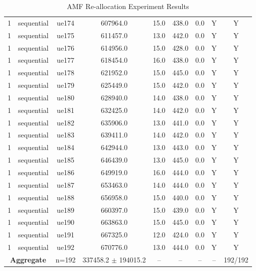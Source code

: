 \begin{table}[ht]
\begin{tabular}{|c|c|c|c|c|c|c|c|c|}
1 & sequential & ue174 & 607964.0 & 15.0 & 438.0 & 0.0 & Y & Y \\
1 & sequential & ue175 & 611457.0 & 13.0 & 442.0 & 0.0 & Y & Y \\
1 & sequential & ue176 & 614956.0 & 15.0 & 428.0 & 0.0 & Y & Y \\
1 & sequential & ue177 & 618454.0 & 16.0 & 438.0 & 0.0 & Y & Y \\
1 & sequential & ue178 & 621952.0 & 15.0 & 445.0 & 0.0 & Y & Y \\
1 & sequential & ue179 & 625449.0 & 15.0 & 442.0 & 0.0 & Y & Y \\
1 & sequential & ue180 & 628940.0 & 14.0 & 438.0 & 0.0 & Y & Y \\
1 & sequential & ue181 & 632425.0 & 14.0 & 442.0 & 0.0 & Y & Y \\
1 & sequential & ue182 & 635906.0 & 13.0 & 441.0 & 0.0 & Y & Y \\
1 & sequential & ue183 & 639411.0 & 14.0 & 442.0 & 0.0 & Y & Y \\
1 & sequential & ue184 & 642944.0 & 13.0 & 443.0 & 0.0 & Y & Y \\
1 & sequential & ue185 & 646439.0 & 13.0 & 445.0 & 0.0 & Y & Y \\
1 & sequential & ue186 & 649919.0 & 16.0 & 444.0 & 0.0 & Y & Y \\
1 & sequential & ue187 & 653463.0 & 14.0 & 444.0 & 0.0 & Y & Y \\
1 & sequential & ue188 & 656958.0 & 15.0 & 440.0 & 0.0 & Y & Y \\
1 & sequential & ue189 & 660397.0 & 15.0 & 439.0 & 0.0 & Y & Y \\
1 & sequential & ue190 & 663863.0 & 15.0 & 445.0 & 0.0 & Y & Y \\
1 & sequential & ue191 & 667325.0 & 12.0 & 424.0 & 0.0 & Y & Y \\
1 & sequential & ue192 & 670776.0 & 13.0 & 444.0 & 0.0 & Y & Y \\
\multicolumn{2}{|c|}{\textbf{Aggregate}} & n=192 & 337458.2 $\pm$ 194015.2 & -- & -- & -- & -- & 192/192 \\
\hline
\end{tabular}
\caption{AMF Re-allocation Experiment Results}
\label{tab:amf_realloc}
\end{table}
